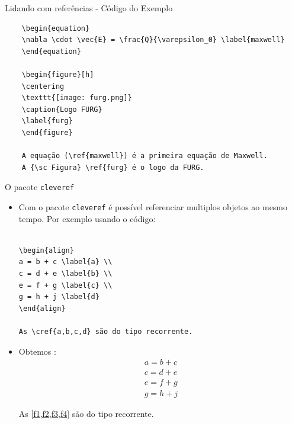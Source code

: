 \documentclass[c]{beamer}
\renewcommand*{\vec}{\vv}%
\begin{document}
{\begin{frame}[fragile]{\sc Lidando com referências - Código do Exemplo}
	\scriptsize
	\begin{verbatim}
	\begin{equation}
	\nabla \cdot \vec{E} = \frac{Q}{\varepsilon_0} \label{maxwell}
	\end{equation}

	\begin{figure}[h]
	\centering
	\texttt{[image: furg.png]}
	\caption{Logo FURG}
	\label{furg}
	\end{figure}
	
	A equação (\ref{maxwell}) é a primeira equação de Maxwell.
	A {\sc Figura} \ref{furg} é o logo da FURG.
	\end{verbatim}
\end{frame}

\begin{frame}[fragile]{\sc O pacote \texttt{cleveref}}
\begin{itemize}
\item Com o pacote {\color{blue}\verb|cleveref|} é possível referenciar {\color{blue} multiplos objetos} ao mesmo tempo. Por exemplo usando o código:
\begin{verbatim}

\begin{align}
a = b + c \label{a} \\ 
c = d + e \label{b} \\ 
e = f + g \label{c} \\ 
g = h + j \label{d}
\end{align}

As \cref{a,b,c,d} são do tipo recorrente.
\end{verbatim}

\item Obtemos :
\begin{align}
a = b + c \label{f1}\\ 
c = d + e \label{f2}\\ 
e = f + g \label{f3}\\ 
g = h + j  \label{f4}
\end{align}

As \cref{f1,f2,f3,f4} são do tipo recorrente.

\end{itemize}
\end{frame}

}
\end{document}
